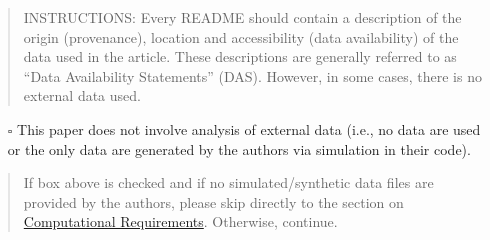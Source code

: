 \documentclass[
]{article}
\providecommand{\tightlist}{%
  \setlength{\itemsep}{0pt}\setlength{\parskip}{0pt}}
\begin{document}
\begin{quote}
INSTRUCTIONS: Every README should contain a description of the origin
(provenance), location and accessibility (data availability) of the data
used in the article. These descriptions are generally referred to as
``Data Availability Statements'' (DAS). However, in some cases, there is
no external data used.
\end{quote}

\begin{itemize}
\tightlist
\item[$\square$]
  This paper does not involve analysis of external data (i.e., no data
  are used or the only data are generated by the authors via simulation
  in their code).
\end{itemize}

\begin{quote}
If box above is checked and if no simulated/synthetic data files are
provided by the authors, please skip directly to the section on
\protect\hyperlink{computational-requirements}{Computational
Requirements}. Otherwise, continue.
\end{quote}
\end{document}
